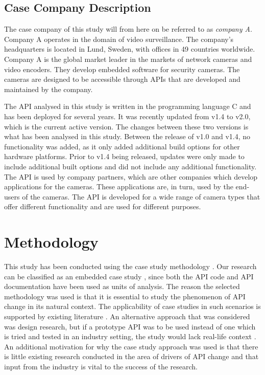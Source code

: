 \documentclass{sig-alternate}
\begin{document}
 


\subsection{Case Company Description} \label{case_company_description}
The case company of this study will from here on be referred to as \textit{company A}. Company A operates in the domain of video surveillance. The company's headquarters is located in Lund, Sweden, with offices in 49 countries worldwide. Company A is the global market leader in the markets of network cameras and video encoders. They develop embedded software for security cameras. The cameras are designed to be accessible through APIs that are developed and maintained by the company. 

The API analysed in this study is written in the programming language C and has been deployed for several years. It was recently updated from v1.4 to v2.0, which is the current active version. The changes between these two versions is what has been analysed in this study. Between the release of v1.0 and v1.4, no functionality was added, as it only added additional build options for other hardware platforms. Prior to v1.4 being released, updates were only made to include additional built options and did not include any additional functionality. The API is used by company partners, which are other companies which develop applications for the cameras. These applications are, in turn, used by the end-users of the cameras. The API is developed for a wide range of camera types that offer different functionality and are used for different purposes. 



\section{Methodology} \label{methodology}


This study has been conducted using the case study methodology \cite{runeson2009guidelines}. Our research can be classified as an embedded case study \cite{yin2013case}, since both the API code and API documentation have been used as units of analysis. The reason the selected methodology was used is that it is essential to study the phenomenon of API change in its natural context. The applicability of case studies in such scenarios is supported by existing literature \cite{benbasat1987case, robson2002real, runeson2009guidelines, yin2013case}. An alternative approach that was considered was design research, but if a prototype API was to be used instead of one which is tried and tested in an industry setting, the study would lack real-life context \cite{runeson2009guidelines}. An additional motivation for why the case study approach was used is that there is little existing research conducted in the area of drivers of API change and that input from the industry is vital to the success of the research. 
\end{document}
